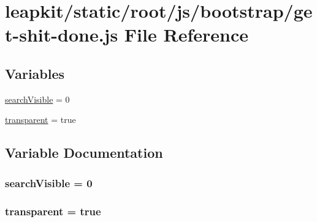 \hypertarget{static_2root_2js_2bootstrap_2get-shit-done_8js}{\section{leapkit/static/root/js/bootstrap/get-\/shit-\/done.js File Reference}
\label{static_2root_2js_2bootstrap_2get-shit-done_8js}
}
\subsection*{Variables}
\begin{DoxyCompactItemize}
\item 
\hyperlink{static_2root_2js_2bootstrap_2get-shit-done_8js_a169a672a87ad7c44e789ba999e951746}{search\-Visible} = 0
\item 
\hyperlink{static_2root_2js_2bootstrap_2get-shit-done_8js_afcf048cb5f3a491171d07131ff77f83c}{transparent} = true
\end{DoxyCompactItemize}


\subsection{Variable Documentation}
\hypertarget{static_2root_2js_2bootstrap_2get-shit-done_8js_a169a672a87ad7c44e789ba999e951746}{
\subsubsection[{search\-Visible}]{\setlength{\rightskip}{0pt plus 5cm}search\-Visible = 0}}\label{static_2root_2js_2bootstrap_2get-shit-done_8js_a169a672a87ad7c44e789ba999e951746}
\hypertarget{static_2root_2js_2bootstrap_2get-shit-done_8js_afcf048cb5f3a491171d07131ff77f83c}{
\subsubsection[{transparent}]{\setlength{\rightskip}{0pt plus 5cm}transparent = true}}\label{static_2root_2js_2bootstrap_2get-shit-done_8js_afcf048cb5f3a491171d07131ff77f83c}
